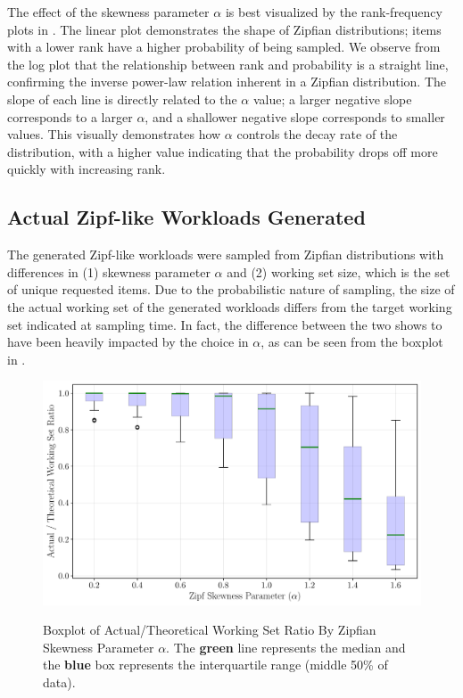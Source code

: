 The effect of the skewness parameter $\alpha$ is best visualized by the rank-frequency plots in . The linear plot demonstrates the shape of Zipfian distributions; items with a lower rank have a higher probability of being sampled. We observe from the log plot that the relationship between rank and probability is a straight line, confirming the inverse power-law relation inherent in a Zipfian distribution. The slope of each line is directly related to the $\alpha$ value; a larger negative slope corresponds to a larger $\alpha$, and a shallower negative slope corresponds to smaller values. This visually demonstrates how $\alpha$ controls the decay rate of the distribution, with a higher value indicating that the probability drops off more quickly with increasing rank.


\subsection{Actual Zipf-like Workloads Generated}

The generated Zipf-like workloads were sampled from Zipfian distributions with differences in (1) skewness parameter $\alpha$ and (2) working set size, which is the set of unique requested items. Due to the probabilistic nature of sampling, the size of the actual working set of the generated workloads differs from the target working set indicated at sampling time. In fact, the difference between the two shows to have been heavily impacted by the choice in $\alpha$, as can be seen from the boxplot in .

\begin{figure}[h!]
    \centering
    \captionsetup{justification=centering}
    \caption{Boxplot of Actual/Theoretical Working Set Ratio By Zipfian Skewness Parameter $\alpha$. The {\color{PineGreen}\textbf{green}} line represents the median and the {\color{blue}\textbf{blue}} box represents the interquartile range (middle 50\% of data).}
    \includegraphics[width=0.8\linewidth]{figures/workloads/boxplot_alpha_vs_actual_theoretical_ratio.pdf}
    \label{fig:boxplot-actual-theoretical-ratio}
\end{figure}

